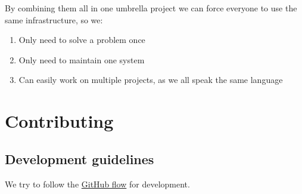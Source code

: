 \documentclass[12pt,]{article}
\providecommand{\tightlist}{%
  \setlength{\itemsep}{0pt}\setlength{\parskip}{0pt}}
\begin{document}
By combining them all in one umbrella project we can force everyone to
use the same infrastructure, so we:

\begin{enumerate}
\def\labelenumi{\arabic{enumi}.}
\tightlist
\item
  Only need to solve a problem once
\item
  Only need to maintain one system
\item
  Can easily work on multiple projects, as we all speak the same
  language
\end{enumerate}

\section{Contributing}\label{contributing}

\subsection{Development guidelines}\label{development-guidelines}

We try to follow the
\href{https://guides.github.com/introduction/flow/}{GitHub flow} for
development.
\end{document}
